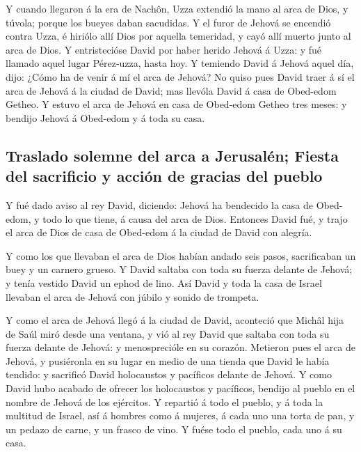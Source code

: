  Y cuando llegaron á la era de Nachôn, Uzza extendió la
mano al arca de Dios, y túvola; porque los bueyes daban sacudidas.
 Y el furor de Jehová se encendió contra Uzza, é hiriólo
allí Dios por aquella temeridad, y cayó allí muerto junto al arca de
Dios.  Y entristecióse David por haber herido Jehová á
Uzza: y fué llamado aquel lugar Pérez-uzza, hasta hoy.  Y
temiendo David á Jehová aquel día, dijo: ¿Cómo ha de venir á mí el arca
de Jehová?  No quiso pues David traer á sí el arca de
Jehová á la ciudad de David; mas llevóla David á casa de Obed-edom
Getheo.  Y estuvo el arca de Jehová en casa de Obed-edom
Getheo tres meses: y bendijo Jehová á Obed-edom y á toda su casa.

\hypertarget{traslado-solemne-del-arca-a-jerusaluxe9n-fiesta-del-sacrificio-y-acciuxf3n-de-gracias-del-pueblo}{%
\subsection{Traslado solemne del arca a Jerusalén; Fiesta del sacrificio
y acción de gracias del
pueblo}\label{traslado-solemne-del-arca-a-jerusaluxe9n-fiesta-del-sacrificio-y-acciuxf3n-de-gracias-del-pueblo}}

 Y fué dado aviso al rey David, diciendo: Jehová ha
bendecido la casa de Obed-edom, y todo lo que tiene, á causa del arca de
Dios. Entonces David fué, y trajo el arca de Dios de casa de Obed-edom á
la ciudad de David con alegría.

 Y como los que llevaban el arca de Dios habían andado
seis pasos, sacrificaban un buey y un carnero grueso.  Y
David saltaba con toda su fuerza delante de Jehová; y tenía vestido
David un ephod de lino.  Así David y toda la casa de
Israel llevaban el arca de Jehová con júbilo y sonido de trompeta.

 Y como el arca de Jehová llegó á la ciudad de David,
aconteció que Michâl hija de Saúl miró desde una ventana, y vió al rey
David que saltaba con toda su fuerza delante de Jehová: y menosprecióle
en su corazón.  Metieron pues el arca de Jehová, y
pusiéronla en su lugar en medio de una tienda que David le había
tendido: y sacrificó David holocaustos y pacíficos delante de Jehová.
 Y como David hubo acabado de ofrecer los holocaustos y
pacíficos, bendijo al pueblo en el nombre de Jehová de los ejércitos.
 Y repartió á todo el pueblo, y á toda la multitud de
Israel, así á hombres como á mujeres, á cada uno una torta de pan, y un
pedazo de carne, y un frasco de vino. Y fuése todo el pueblo, cada uno á
su casa.

